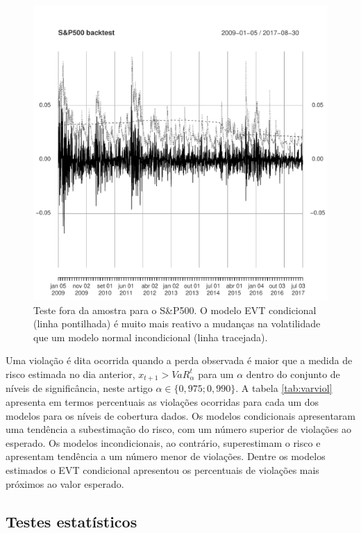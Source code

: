\documentclass[review]{elsarticle}
\theoremstyle{definition}
\begin{document}
\begin{figure}[H]
	\centering
	\includegraphics[width=1\linewidth]{figs/artigo-sp500backtest}
	\caption{Teste fora da amostra para o S\&P500. O modelo EVT condicional (linha pontilhada) é muito mais reativo a mudanças na volatilidade que um modelo normal incondicional (linha tracejada).}
	\label{fig:artigo-sp500backtest}
\end{figure}

Uma violação é dita ocorrida quando a perda observada é maior que a medida de risco estimada no dia anterior, $x_{t+1}>VaR^t_\alpha$ para um $\alpha$ dentro do conjunto de níveis de significância, neste artigo $\alpha \in \{0,975; 0,990\}$. A tabela \ref{tab:varviol} apresenta em termos percentuais as violações ocorridas para cada um dos modelos para os níveis de cobertura dados. Os modelos condicionais apresentaram uma tendência a subestimação do risco, com um número superior de violações ao esperado. Os modelos incondicionais, ao contrário, superestimam o risco e apresentam tendência a um número menor de violações. Dentre os modelos estimados o EVT condicional apresentou os percentuais de violações mais próximos ao valor esperado.



\subsection{Testes estatísticos}
\label{sec:testes}
\end{document}
